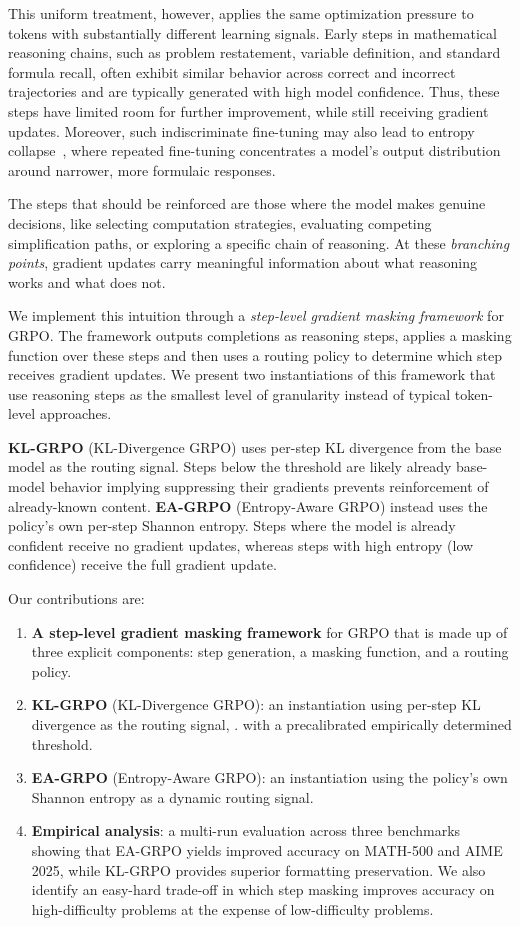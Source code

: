 \documentclass{article}
\begin{document}
This uniform treatment, however, applies the same optimization pressure to tokens with substantially different learning signals. Early steps in mathematical reasoning chains, such as problem restatement, variable definition, and standard formula recall, often exhibit similar behavior across correct and incorrect trajectories and are typically generated with high model confidence. Thus, these steps have limited room for further improvement, while still receiving gradient updates. Moreover, such indiscriminate fine-tuning may also lead to entropy collapse~\cite{yu2025dapoopensourcellmreinforcement}, where repeated fine-tuning concentrates a model's output distribution around narrower, more formulaic responses.

The steps that should be reinforced are those where the model makes genuine decisions, like selecting computation strategies, evaluating competing simplification paths, or exploring a specific chain of reasoning. At these \emph{branching points}, gradient updates carry meaningful information about what reasoning works and what does not.

We implement this intuition through a \emph{step-level gradient masking framework} for GRPO. The framework outputs completions as reasoning steps, applies a masking function over these steps and then uses a routing policy to determine which step receives gradient updates. We present two instantiations of this framework that use reasoning steps as the smallest level of granularity instead of typical token-level approaches.

\textbf{KL-GRPO} (KL-Divergence GRPO) uses per-step KL divergence from the base model as the routing signal. Steps below the threshold are likely already base-model behavior implying suppressing their gradients prevents reinforcement of already-known content. \textbf{EA-GRPO} (Entropy-Aware GRPO) instead uses the policy's own per-step Shannon entropy. Steps where the model is already confident receive no gradient updates, whereas steps with high entropy (low confidence) receive the full gradient update.

Our contributions are:
\begin{enumerate}
    \item \textbf{A step-level gradient masking framework} for GRPO that is made up of three explicit components: step generation, a masking function, and a routing policy.
    \item \textbf{KL-GRPO} (KL-Divergence GRPO): an instantiation using per-step KL divergence as the routing signal, . with a precalibrated empirically determined threshold.
    \item \textbf{EA-GRPO} (Entropy-Aware GRPO): an instantiation using the policy's own Shannon entropy as a dynamic routing signal.
    \item \textbf{Empirical analysis}: a multi-run evaluation across three benchmarks showing that EA-GRPO yields improved accuracy on MATH-500 and AIME 2025, while KL-GRPO provides superior formatting preservation. We also identify an easy-hard trade-off in which step masking improves accuracy on high-difficulty problems at the expense of low-difficulty problems.
\end{enumerate}
\end{document}
